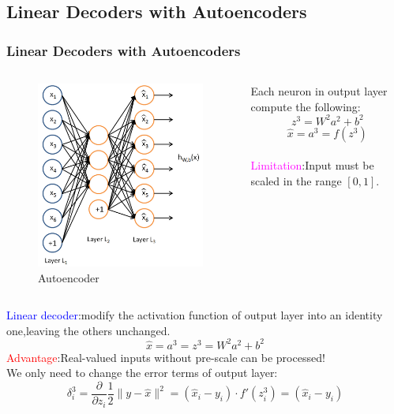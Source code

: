 \documentclass{beamer}
\begin{document}
\begin{CJK*}{UTF8}{gbsn}
\section{Linear Decoders with Autoencoders}
\begin{frame}\frametitle{Linear Decoders with Autoencoders}
\begin{columns}
\begin{column}{0.35\linewidth}
\begin{figure}
\centering
\includegraphics[scale=0.15]{images/Autoencoder}
\caption{Autoencoder}
\end{figure}
\end{column}
\begin{column}{0.7\linewidth}
Each neuron in output layer compute the following:
\begin{equation}
z^3=W^2a^2+b^2
\end{equation}
\begin{equation}
\hat{x}=a^3=f(z^3)
\end{equation}\\
\vspace{20pt}
\textcolor{magenta}{Limitation}:Input must be scaled in the range $[0,1]$.
\end{column}
\end{columns}
\textcolor{blue}{Linear decoder}:modify the activation function of output layer into an identity one,leaving the others unchanged.
\begin{equation}
\hat{x}=a^3=z^3=W^2a^2+b^2
\end{equation}
\textcolor{red}{Advantage}:Real-valued inputs without pre-scale can be processed!\\
We only need to change the error terms of output layer:
\begin{equation}
\delta_i^3=\frac{\partial}{\partial z_i}\frac{1}{2}\|y-\hat{x}\|^2=(\hat{x}_i-y_i)\cdot f'(z_i^3)=(\hat{x}_i-y_i)
\end{equation}
\end{frame}


\end{CJK*}
\end{document}
